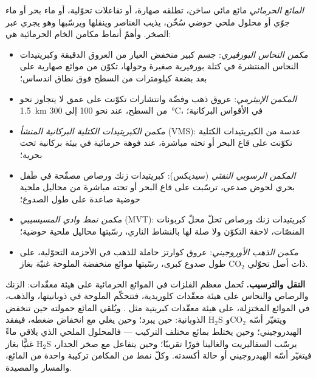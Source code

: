 \begin{definition}\label{def:b2:ore-deposits:hydrothermal}
\emph{المائع الحرمائي} مائع مائي ساخن، تطلقه صهارة،
أو تفاعلات تحوّلية، أو ماء بحر أو ماء جوّي أو محلول ملحي حوضي سُخّن، يذيب العناصر
وينقلها ويرسّبها وهو يجري عبر الصخر. وأهمّ أنماط مكامن الخام الحرمائية
هي:
\begin{itemize}
  \item \emph{مكمن النحاس البورفيري}: جسم كبير منخفض العيار
        من العروق الدقيقة وكبريتيدات النحاس المنتشرة في كتلة بورفيرية صغيرة وحولها، تكوّن من
        موائع صهارية على بعد بضعة كيلومترات من السطح فوق نطاق اندساس؛
  \item \emph{المكمن الإبيثرمي}: عروق ذهب وفضّة وانتشارات
        تكوّنت على عمق لا يتجاوز نحو \qty{1.5}{km} من السطح، عند نحو 100 إلى
        \qty{300}{\celsius}، في الأقواس البركانية؛
  \item \emph{مكمن الكبريتيدات الكتلية البركانية المنشأ}
        (VMS): عدسة من الكبريتيدات الكتلية تكوّنت على قاع البحر أو تحته مباشرة، عند فوهة
        حرمائية في بيئة بركانية تحت بحرية؛
  \item \emph{المكمن الرسوبي النفثي} (سيديكس):
        كبريتيدات زنك ورصاص مصفّحة في طَفل بحري لحوض صدعي، ترسّبت على قاع البحر أو
        تحته مباشرة من محاليل ملحية حوضية صاعدة على طول الصدوع؛
  \item \emph{مكمن نمط وادي المسيسيبي} (MVT):
        كبريتيدات زنك ورصاص تحلّ محلّ كربونات المنصّات، لاحقة التكوّن ولا صلة لها بالنشاط
        الناري، رسّبتها محاليل ملحية حوضية؛
  \item \emph{مكمن الذهب الأوروجيني}: عروق كوارتز حاملة للذهب في
        الأحزمة التحوّلية، على طول صدوع كبرى، رسّبتها موائع منخفضة الملوحة غنيّة بغاز CO$_2$
        ذات أصل تحوّلي.
\end{itemize}
\end{definition}

\textbf{النقل والترسيب.} تُحمل معظم الفلزات في الموائع الحرمائية على هيئة معقّدات:
الزنك والرصاص والنحاس على هيئة معقّدات كلوريدية، فتتحكّم الملوحة في ذوبانيتها، والذهب،
في الموائع المختزِلة، على هيئة معقّدات كبريتية مثل . ويُلقي المائع حمولته حين
تنخفض الذوبانية: حين يبرد؛ وحين يغلي مع انخفاض ضغطه، فيفقد H$_2$S وCO$_2$
ويتغيّر أسّه الهيدروجيني؛ وحين يختلط بمائع مختلف التركيب --- فالمحلول الملحي الذي يلاقي ماءً غنيًّا
بغاز H$_2$S يرسّب السفاليريت والغالينا فورًا تقريبًا؛ وحين يتفاعل مع صخر
الجدار، فيتغيّر أسّه الهيدروجيني أو حالة أكسدته. وكلّ نمط من المكامن تركيبة واحدة من المائع،
والمسار والمصيدة.

